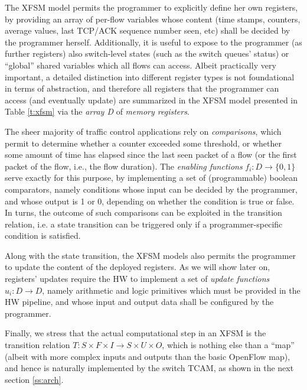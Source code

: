 \documentclass{sig-alternate}
\begin{document}
\vspace{3pt}  The XFSM model permits the programmer to explicitly define her own registers, by providing an array of per-flow variables whose content (time stamps, counters, average values, last TCP/ACK sequence number seen, etc) shall be decided by the programmer herself. Additionally, it is useful to expose to the programmer (as further registers) also switch-level states (such as the switch queues' status) or ``global'' shared variables which all flows can access. Albeit practically very important, a detailed distinction into different register types is not foundational in terms of abstraction, and therefore all registers that the programmer can access (and eventually update) are summarized in the XFSM model presented in Table \ref{t:xfsm} via the {\em array D} of {\em memory registers}.

\vspace{3pt}  The sheer majority of traffic control applications rely on {\em comparisons}, which permit to determine whether a counter exceeded some threshold, or whether some amount of time has elapsed since the last seen packet of a flow (or the first packet of the flow, i.e., the flow duration). The {\em enabling functions} $f_i:D\rightarrow\{0,1\}$ serve exactly for this purpose, by implementing a set of (programmable) boolean comparators, namely conditions whose input can be decided by the programmer, and whose output is 1 or 0, depending on whether the condition is true or false. In turns, the outcome of such comparisons can be exploited in the transition relation, i.e. a state transition can be triggered only if a programmer-specific condition is satisfied. 

\vspace{3pt}  Along with the state transition, the XFSM models also permits the programmer to update the content of the deployed registers. As we will show later on, registers'  updates require the HW to implement a set of {\em update functions} $u_i:D\rightarrow D$, namely arithmetic and logic primitives which must be provided in the HW pipeline, and whose input and output data shall be configured by the programmer.

\vspace{3pt} Finally, we stress that the actual computational step in an XFSM is the transition relation $T : S \times F \times I \rightarrow S \times U \times O$, which is nothing else than a ``map'' (albeit with more complex inputs and outputs than the basic OpenFlow map), and hence is naturally implemented by the switch TCAM, as shown in the next section \ref{ss:arch}.
\end{document}
